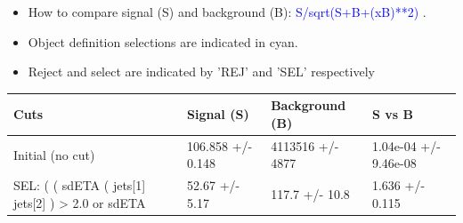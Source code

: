 \documentclass[a4paper, 10pt]{article}
\begin{document}
\begin{itemize}
  \item How to compare signal (S) and background (B): \textcolor{blue}{S/\-sqrt(S+B+(xB)**2)} .
   \item Object definition selections are indicated in cyan.  \item Reject and select are indicated by 'REJ' and 'SEL' respectively
\end{itemize}
\begin{table}[H]
  \begin{center}
    \begin{tabular}{|m{36.0mm}|m{36.0mm}|m{36.0mm}|m{33.0mm}|}
      \hline
      {\cellcolor{yellow}        Cuts}& {\cellcolor{yellow}         Signal (S)}& {\cellcolor{yellow}         Background (B)}& {\cellcolor{yellow}         S vs B}\\
      \hline
      {\cellcolor{white}         Initial (no cut)}& {\cellcolor{white}         106.858 +/\-- 0.148}& {\cellcolor{white}         4113516 +/\-- 4877}& {\cellcolor{white}         1.04e-04 +/\-- 9.46e-08}\\
      \hline
      {\cellcolor{white} SEL: ( ( sdETA ( jets[1] jets[2] ) > 2.0 or sdETA }& {\cellcolor{white}         52.67 +/\-- 5.17}& {\cellcolor{white}         117.7 +/\-- 10.8}& {\cellcolor{white}         1.636 +/\-- 0.115}\\
\hline
    \end{tabular}
  \end{center}
\end{table}
\end{document}
